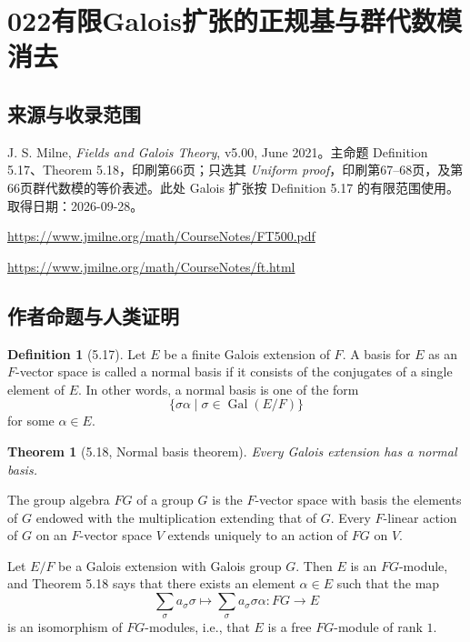 \documentclass[UTF8,11pt]{ctexart}
\newtheorem*{theorem}{Theorem}
\theoremstyle{definition}
\newtheorem*{definition}{Definition}
\begin{document}
\section*{022\quad 有限Galois扩张的正规基与群代数模消去}
\subsection*{来源与收录范围}
J. S. Milne, \emph{Fields and Galois Theory}, v5.00, June 2021。主命题 Definition 5.17、Theorem 5.18，印刷第66页；只选其 \emph{Uniform proof}，印刷第67--68页，及第66页群代数模的等价表述。此处 Galois 扩张按 Definition 5.17 的有限范围使用。取得日期：2026-09-28。
\par\url{https://www.jmilne.org/math/CourseNotes/FT500.pdf}
\par\url{https://www.jmilne.org/math/CourseNotes/ft.html}
\subsection*{作者命题与人类证明}
\begin{definition}[5.17]
Let $E$ be a finite Galois extension of $F$. A basis for $E$ as an $F$-vector space is called a normal basis if it consists of the conjugates of a single element of $E$. In other words, a normal basis is one of the form
\[
\{\sigma\alpha\mid\sigma\in\operatorname{Gal}(E/F)\}
\]
for some $\alpha\in E$.
\end{definition}
\begin{theorem}[5.18, Normal basis theorem]
Every Galois extension has a normal basis.
\end{theorem}
The group algebra $FG$ of a group $G$ is the $F$-vector space with basis the elements of $G$ endowed with the multiplication extending that of $G$. Every $F$-linear action of $G$ on an $F$-vector space $V$ extends uniquely to an action of $FG$ on $V$.

Let $E/F$ be a Galois extension with Galois group $G$. Then $E$ is an $FG$-module, and Theorem 5.18 says that there exists an element $\alpha\in E$ such that the map
\[
\sum_{\sigma}a_\sigma\sigma\longmapsto\sum_{\sigma}a_\sigma\sigma\alpha:FG\longrightarrow E
\]
is an isomorphism of $FG$-modules, i.e., that $E$ is a free $FG$-module of rank $1$.
\end{document}
